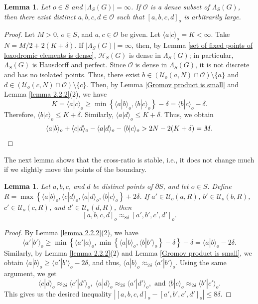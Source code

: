 \documentclass[11pt,letterpaper]{article}
\renewcommand{\l}{\langle}
\renewcommand{\r}{\rangle}
\newtheorem{lem}[thm]{Lemma}
\theoremstyle{definition}
\theoremstyle{remark}
\begin{document}
\begin{lem}\label{cross-ratio is arbirtary large}
Let $o \in S$ and $|\Lambda_S(G)|=\infty$. If $\mathcal{O}$ is a dense subset of $\Lambda_S(G)$, then there exist distinct $a,b,c,d \in \mathcal{O}$ such that $[a,b,c,d]_o$ is arbitrarily large. 
\end{lem}
\begin{proof}
Let $M >0$, $o\in S$, and $a, c \in \mathcal{O}$ be given. Let $\l a|c \r_o=K < \infty$. Take $N=M/2+2(K+\delta)$.
If $|\Lambda_S(G)|=\infty$, then, by  Lemma \ref{set of fixed points of loxodromic elements is dense}, $\mathcal{H}_S(G)$ is dense in $\Lambda_S(G)$; in particular, $\Lambda_S(G)$ is Hausdorff and perfect. Since $\mathcal{O}$ is dense in $\Lambda_S(G)$, it is not discrete and has no isolated points. Thus, there exist $b \in (\mathcal U_o(a,N)\cap \mathcal{O})\setminus\{a\}$ and $d \in (\mathcal U_o(c,N)\cap \mathcal{O})\setminus\{c\}$. Then, by Lemma \ref{Gromov product is small} and Lemma \ref{lemma 2.2.2}(2), we have
$$
K=\l a|c\r_o \geq \min\left\{\l a|b\r_o,\l b|c\r_o\right\} - \delta = \l b|c\r_o - \delta.
$$
Therefore, $\l b|c\r_o \leq K+\delta$. Similarly, $\l a|d\r_o \leq K+\delta$. Thus, we obtain
$$
\l a|b\r_o + \l c|d\r_o -\l a|d\r_o -\l b|c\r_o > 2N - 2(K+\delta) =M. \qedhere
$$
\end{proof}
The next lemma shows that the cross-ratio is stable, i.e., it does not change much if we slightly move the points of the boundary. 
\begin{lem}\label{cross-ratio doesn't change much}
Let $ a,b, c$, and $d$ be distinct points of $\partial S$, and let $o \in S$. Define $R=\max\left\{\l a|b\r_o, \l c|d\r_o, \l a|d\r_o, \l b|c\r_o \right\}+2\delta$. 
If $a' \in \mathcal U_o(a, R)$, $b' \in \mathcal U_o(b, R)$, $c' \in \mathcal U_o(c, R)$, and  $d' \in \mathcal U_o(d, R)$, then 
$$
[a, b, c, d]_o \approx_{8\delta} [a', b', c', d']_o.
$$
\end{lem} 
\begin{proof}
By Lemma \ref{lemma 2.2.2}(2), we have
$$
\l a'|b'\r_o \geq \min\left\{\l a'|a\r_o,\min\left\{\l a|b\r_o, \l b|b'\r_o\right\} - \delta\right\} - \delta=\l a|b\r_o - 2\delta.
$$
Similarly, by Lemma \ref{lemma 2.2.2}(2) and Lemma \ref{Gromov product is small}, we obtain $\l a|b\r_o \geq \l a'|b'\r_o - 2\delta$, and thus, $\l a|b\r_o \approx_{2\delta} \l a'|b'\r_o$.
Using the same argument, we get
$$
\l c|d\r_o \approx_{2\delta} \l c'|d'\r_o, \; \l a|d\r_o \approx_{2\delta} \l a'|d'\r_o, \text{ and } \l b|c\r_o \approx_{2\delta} \l b'|c'\r_o.
$$
This gives us the desired inequality $\left|[a,b,c,d]_o - [a',b',c',d']_o\right|\leq 8\delta$.
\end{proof}
\end{document}
